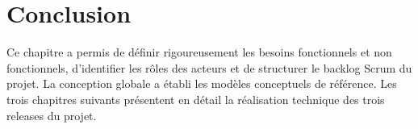 \section*{Conclusion}
Ce chapitre a permis de d\'efinir rigoureusement les besoins fonctionnels et non fonctionnels, d'identifier les r\^oles des acteurs et de structurer le backlog Scrum du projet. La conception globale a \'etabli les mod\`eles conceptuels de r\'ef\'erence. Les trois chapitres suivants pr\'esentent en d\'etail la r\'ealisation technique des trois releases du projet.